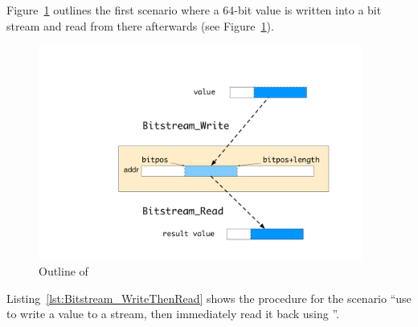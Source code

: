 Figure~\ref{fig:bitstream-writethenread} outlines the first scenario
where a 64-bit value is written into a bit stream and read from there
afterwards (see Figure~\ref{fig:bitstream-writethenread}).

\begin{figure}[hbt]
\begin{center}
\includegraphics[width=0.95\textwidth]{figures/bitstream-writethenread.pdf}
\caption{\label{fig:bitstream-writethenread}
        Outline of }
\end{center}
\end{figure}

\FloatBarrier

Listing~\ref{lst:Bitstream_WriteThenRead}
shows the procedure for the scenario ``use 
to write a value to a stream, then immediately read it back using
''.


